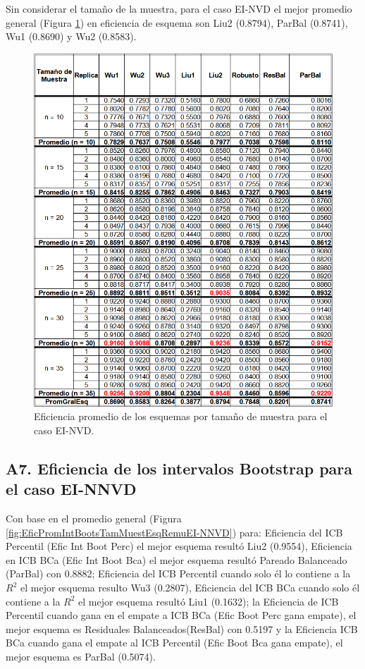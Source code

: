 Sin considerar el tamaño de la muestra, para el caso EI-NVD el mejor promedio general (Figura \ref{fig:EficPromEsqTamMuesEsqRemuEI-NVD}) en eficiencia de esquema son Liu2 (0.8794), ParBal (0.8741), Wu1 (0.8690) y Wu2 (0.8583).

\begin{figure}[ht] 
	\centering 
	\includegraphics[width=0.70\linewidth]{img/EI_NVD_Efic_Esq.png} 
	\caption{Eficiencia promedio de los esquemas por tamaño de muestra para el caso EI-NVD.} 
	\label{fig:EficPromEsqTamMuesEsqRemuEI-NVD}
\end{figure}
\FloatBarrier




\subsection*{A7. Eficiencia de los intervalos Bootstrap para el caso EI-NNVD}

Con base en el promedio general (Figura \ref{fig:EficPromIntBootsTamMuestEsqRemuEI-NNVD}) para: Eficiencia del ICB Percentil (Efic Int Boot Perc) el mejor esquema resultó Liu2 (0.9554), Eficiencia en ICB BCa (Efic Int Boot Bca) el mejor esquema resultó Pareado Balanceado (ParBal) con 0.8882; Eficiencia del ICB Percentil cuando solo él lo contiene a la $R^{2}$ el mejor esquema resulto Wu3 (0.2807), Eficiencia del ICB BCa cuando solo él contiene a la $R^{2}$ el mejor esquema resultó Liu1 (0.1632); la Eficiencia de ICB Percentil cuando gana en el empate a ICB BCa (Efic Boot Perc gana empate), el mejor esquema es Residuales Balanceados(ResBal) con 0.5197 y la Eficiencia ICB BCa cuando gana el empate al ICB Percentil (Efic Boot Bca gana empate), el mejor esquema es ParBal (0.5074).\\

